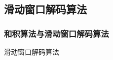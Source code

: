 \documentclass{beamer}
\begin{document}
\subsection{滑动窗口解码算法}
\begin{frame}[shrink]
	\frametitle{和积算法与滑动窗口解码算法}
		\begin{block}{滑动窗口解码算法}
		\begin{center}
\def\linkdoub{\draw [double distance=1mm, very thick] (0,0)--}
\def\linksing{\draw [very thick] (0,0)--}
\def\check{%
    \filldraw [fill=white,very thick] (0,0) circle (5pt);
    \draw [very thick] (0,3.5pt)--(0,-3.5pt);
    \draw [very thick] (3.5pt,0)--(-3.5pt,0);
}
\def\bit{%
    \filldraw [fill=white,very thick] (0,0) circle (5pt);
    \draw [very thick] (-3.2pt,2.2pt)--(3.2pt,2.2pt);
    \draw [very thick] (-3.2pt,-2.2pt)--(3.2pt,-2.2pt);
}
\def\thetaone{60}
\def\thetatwo{-60}
\def\armLength{0.9}
\def\symbolDist{1}


\end{center}
\end{block}
\end{frame}
\end{document}
